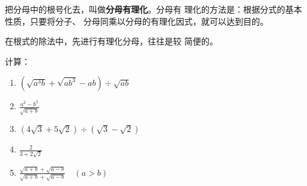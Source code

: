 把分母中的根号化去，叫做\textbf{分母有理化}。分母有
理化的方法是：根据分式的基本性质，只要将分子、
分母同乘以分母的有理化因式，就可以达到目的。

在根式的除法中，先进行有理化分母，往往是较
简便的。

\begin{example}
计算：
\begin{multicols}{2}
    \begin{enumerate}
        \item $\left(\sqrt{a^3b}+\sqrt{ab^3}-ab\right)\div \sqrt{ab}$
        \item $\frac{a^2-b^2}{\sqrt{a+b}}$
        \item $\left(4\sqrt{3}+5\sqrt{2}\right)\div \left(\sqrt{3}-\sqrt{2}\right)$
        \item $\frac{2}{3+2\sqrt{2}}$
        \item $\frac{\sqrt{a+b}+\sqrt{a-b}}{\sqrt{a+b}+\sqrt{a-b}}\quad (a>b)$
    \end{enumerate}   
\end{multicols}
\end{example}

